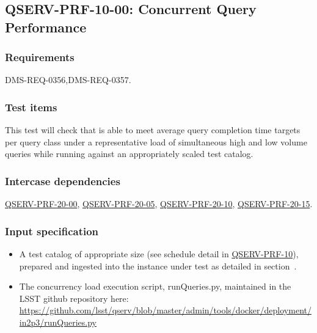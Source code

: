 \subsection{\textsc{QSERV-PRF-10-00}: Concurrent Query Performance}
\label{qserv-prf-10-00}

\subsubsection{Requirements \label{sect:reqs}}

DMS-REQ-0356,DMS-REQ-0357.

\subsubsection{Test items}

This test will check that \product{} is able to meet average query completion time targets per query class
under a representative load of simultaneous high and low volume queries while running against an appropriately
scaled test catalog.

\subsubsection{Intercase dependencies}

\hyperref[qserv-prf-20-00]{\textsc{QSERV-PRF-20-00}},
\hyperref[qserv-prf-20-05]{\textsc{QSERV-PRF-20-05}},
\hyperref[qserv-prf-20-10]{\textsc{QSERV-PRF-20-10}},
\hyperref[qserv-prf-20-15]{\textsc{QSERV-PRF-20-15}}.

\subsubsection{Input specification}

\begin{itemize}

  \item{A test catalog of appropriate size (see schedule detail in \hyperref[qserv-prf-10]{\textsc{
  QSERV-PRF-10}}), prepared and ingested into the \product{} instance under test as detailed in 
  section~.}

  \item{The concurrency load execution script, runQueries.py, maintained in the LSST \product{}
  github repository here: \url{https://github.com/lsst/qserv/blob/master/admin/tools/docker/deployment/in2p3/runQueries.py}}

\end{itemize}

